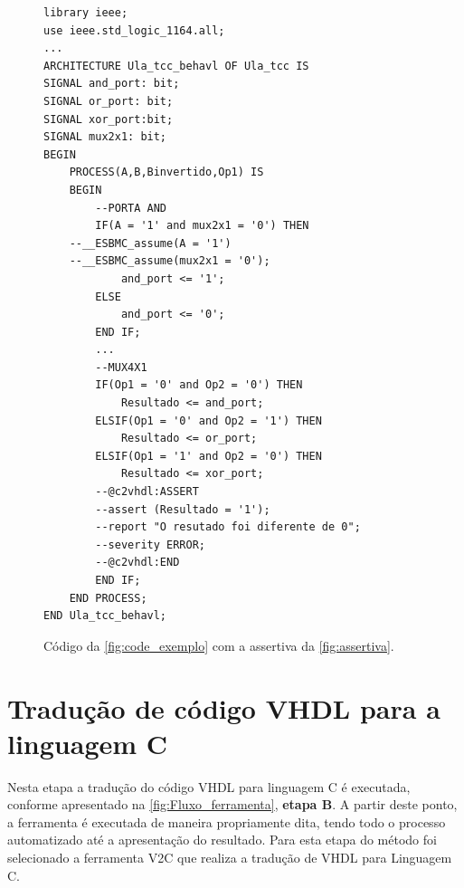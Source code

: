 \begin{figure}[h]
\caption{\label{fig:code_exemplo_assertiva} Código da \autoref{fig:code_exemplo} com a assertiva da \autoref{fig:assertiva}.}
	\begin{center}
    \begin{minipage}{0.99\textwidth}
    \begin{lstlisting}       
library ieee;
use ieee.std_logic_1164.all;
...
ARCHITECTURE Ula_tcc_behavl OF Ula_tcc IS
SIGNAL and_port: bit;
SIGNAL or_port: bit;
SIGNAL xor_port:bit;
SIGNAL mux2x1: bit;
BEGIN
	PROCESS(A,B,Binvertido,Op1) IS
	BEGIN
		--PORTA AND
		IF(A = '1' and mux2x1 = '0') THEN
    --__ESBMC_assume(A = '1')
    --__ESBMC_assume(mux2x1 = '0');
		    and_port <= '1';
		ELSE
		    and_port <= '0';
		END IF;
		...
		--MUX4X1
		IF(Op1 = '0' and Op2 = '0') THEN
			Resultado <= and_port;
		ELSIF(Op1 = '0' and Op2 = '1') THEN
			Resultado <= or_port;
		ELSIF(Op1 = '1' and Op2 = '0') THEN
			Resultado <= xor_port;
        --@c2vhdl:ASSERT
        --assert (Resultado = '1');
        --report "O resutado foi diferente de 0";
        --severity ERROR;
        --@c2vhdl:END
		END IF;
	END PROCESS;
END Ula_tcc_behavl;
    \end{lstlisting}
    \end{minipage}
	\end{center}
\end{figure}


\section{\label{cap:traducao}Tradução de código VHDL para a linguagem C}


\par
Nesta etapa a tradução do código VHDL para linguagem C é executada, conforme apresentado na \autoref{fig:Fluxo_ferramenta}, \textbf{etapa B}. A partir deste ponto, a ferramenta é executada de maneira propriamente dita, tendo todo o processo automatizado até a apresentação do resultado. Para esta etapa do método foi selecionado a ferramenta V2C que realiza a tradução de VHDL para Linguagem C.

